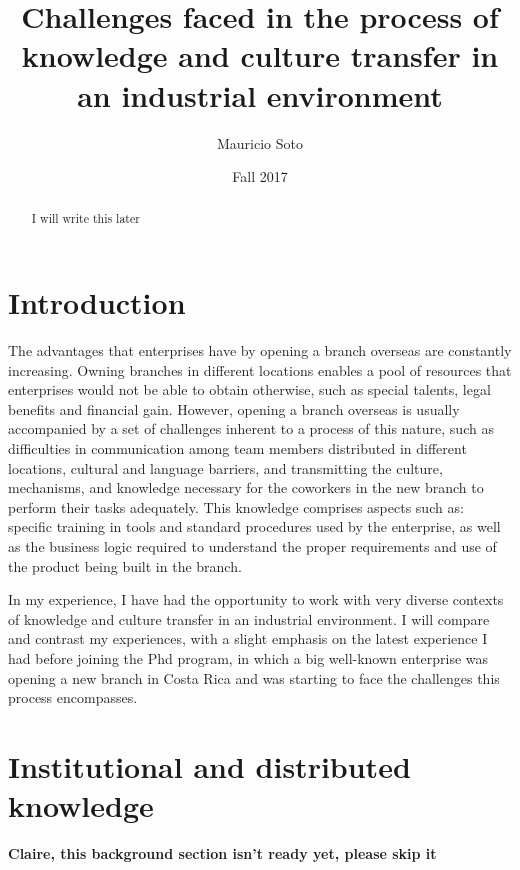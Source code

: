 \documentclass[12pt, letterpaper]{article}
\title{Challenges faced in the process of knowledge and culture transfer in an industrial environment}
\author{Mauricio Soto}
\date{Fall 2017}
\newcommand{\todo}[1]
  {{\scriptsize \textbf{\color{red} {#1}}}}
\begin{document}
 
\begin{titlepage}
\maketitle
\end{titlepage}

\begin{abstract}
I will write this later
\end{abstract}
 
 
\section{Introduction}

The advantages that enterprises have by opening a branch overseas are constantly increasing.
Owning branches in different locations enables a pool of resources that enterprises would not be able
to obtain otherwise, such as special talents, legal benefits and financial gain. However, 
opening a branch overseas is usually accompanied by a set of challenges inherent to a process of this nature, such as 
difficulties in communication among team members distributed in different locations, 
cultural and language barriers, and transmitting the culture, mechanisms, and knowledge necessary for the 
coworkers in the new branch to perform their tasks adequately. 
This knowledge comprises aspects such as: specific training in tools and standard procedures used by the enterprise, as well as the
business logic required to understand the proper requirements and use of the product being built
in the branch.

In my experience, I have had the opportunity to work with very diverse contexts of knowledge and culture transfer in 
an industrial environment. I will compare and contrast my experiences, with a slight emphasis on the 
latest experience I had before joining the Phd program, in which a big well-known enterprise was 
opening a new branch in Costa Rica and was starting to face the challenges this process encompasses.  




 




\section{Institutional and distributed knowledge}
  \todo{Claire, this background section isn't ready yet, please skip it}
\end{document}
